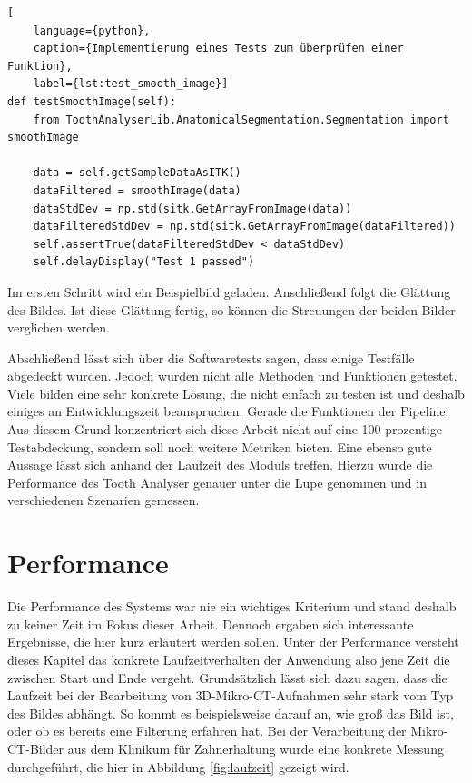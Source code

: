 \begin{lstlisting}[
    language={python},
    caption={Implementierung eines Tests zum überprüfen einer Funktion},
    label={lst:test_smooth_image}]
def testSmoothImage(self):
    from ToothAnalyserLib.AnatomicalSegmentation.Segmentation import smoothImage
   
    data = self.getSampleDataAsITK()
    dataFiltered = smoothImage(data)
    dataStdDev = np.std(sitk.GetArrayFromImage(data))
    dataFilteredStdDev = np.std(sitk.GetArrayFromImage(dataFiltered))
    self.assertTrue(dataFilteredStdDev < dataStdDev)
    self.delayDisplay("Test 1 passed")
\end{lstlisting}

Im ersten Schritt wird ein Beispielbild geladen. Anschließend folgt die Glättung
des Bildes. Ist diese Glättung fertig, so können die Streuungen der beiden Bilder
verglichen werden.

Abschließend lässt sich über die Softwaretests sagen, dass einige Testfälle
abgedeckt wurden. Jedoch wurden nicht alle Methoden und Funktionen getestet.
Viele bilden eine sehr konkrete Lösung, die nicht einfach zu testen ist und deshalb
einiges an Entwicklungszeit beanspruchen. Gerade die Funktionen der Pipeline. Aus
diesem Grund konzentriert sich diese Arbeit nicht auf eine 100 prozentige Testabdeckung,
sondern soll noch weitere Metriken bieten. Eine ebenso gute Aussage lässt sich anhand
der Laufzeit des Moduls treffen. Hierzu wurde die Performance des Tooth Analyser
genauer unter die Lupe genommen und in verschiedenen Szenarien gemessen.

\pagebreak

\section{Performance}
Die Performance des Systems war nie ein wichtiges Kriterium und stand deshalb zu
keiner Zeit im Fokus dieser Arbeit. Dennoch ergaben sich interessante Ergebnisse,
die hier kurz erläutert werden sollen. Unter der Performance versteht dieses
Kapitel das konkrete Laufzeitverhalten der Anwendung also jene Zeit die zwischen
Start und Ende vergeht. Grundsätzlich lässt sich dazu sagen, dass die Laufzeit
bei der Bearbeitung von \ac{3D}-Mikro-\ac{CT}-Aufnahmen sehr stark vom Typ des
Bildes abhängt. So kommt es beispielsweise darauf an, wie groß das Bild ist, oder
ob es bereits eine Filterung erfahren hat. Bei der Verarbeitung der Mikro-\ac{CT}-Bilder
aus dem Klinikum für Zahnerhaltung wurde eine konkrete Messung durchgeführt, die
hier in Abbildung \ref{fig:laufzeit} gezeigt wird.

